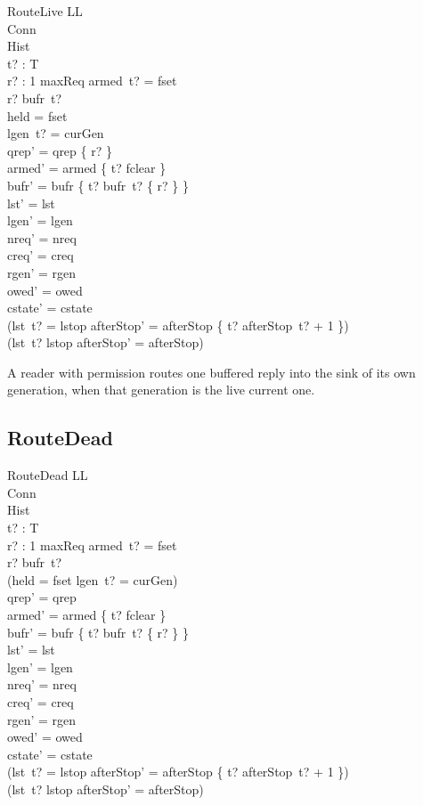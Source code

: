 \documentclass[a4paper,10pt,fleqn]{article}
\begin{document}
\begin{schema}{RouteLive}
  \Delta LL \\
  \Xi Conn \\
  \Xi Hist \\
  t? : T \\
  r? : 1 \upto maxReq
\where
  armed~t? = fset \\
  r? \in bufr~t? \\
  held = fset \\
  lgen~t? = curGen \\
  qrep' = qrep \cup \{ r? \} \\
  armed' = armed \oplus \{ t? \mapsto fclear \} \\
  bufr' = bufr \oplus \{ t? \mapsto bufr~t? \setminus \{ r? \} \} \\
  lst' = lst \\
  lgen' = lgen \\
  nreq' = nreq \\
  creq' = creq \\
  rgen' = rgen \\
  owed' = owed \\
  cstate' = cstate \\
  (lst~t? = lstop \implies
    afterStop' = afterStop \oplus \{ t? \mapsto afterStop~t? + 1 \}) \\
  (lst~t? \neq lstop \implies afterStop' = afterStop)
\end{schema}

A reader with permission routes one buffered reply into the sink of its own generation, when that generation is the live current one.

\subsection{RouteDead}

\begin{schema}{RouteDead}
  \Delta LL \\
  \Xi Conn \\
  \Xi Hist \\
  t? : T \\
  r? : 1 \upto maxReq
\where
  armed~t? = fset \\
  r? \in bufr~t? \\
  \lnot (held = fset \land lgen~t? = curGen) \\
  qrep' = qrep \\
  armed' = armed \oplus \{ t? \mapsto fclear \} \\
  bufr' = bufr \oplus \{ t? \mapsto bufr~t? \setminus \{ r? \} \} \\
  lst' = lst \\
  lgen' = lgen \\
  nreq' = nreq \\
  creq' = creq \\
  rgen' = rgen \\
  owed' = owed \\
  cstate' = cstate \\
  (lst~t? = lstop \implies
    afterStop' = afterStop \oplus \{ t? \mapsto afterStop~t? + 1 \}) \\
  (lst~t? \neq lstop \implies afterStop' = afterStop)
\end{schema}
\end{document}
